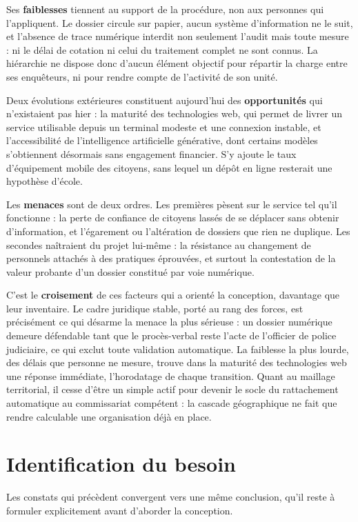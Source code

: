 Ses \textbf{faiblesses} tiennent au support de la procédure, non aux personnes qui l'appliquent. Le dossier circule sur papier, aucun système d'information ne le suit, et l'absence de trace numérique interdit non seulement l'audit mais toute mesure : ni le délai de cotation ni celui du traitement complet ne sont connus. La hiérarchie ne dispose donc d'aucun élément objectif pour répartir la charge entre ses enquêteurs, ni pour rendre compte de l'activité de son unité.

Deux évolutions extérieures constituent aujourd'hui des \textbf{opportunités} qui n'existaient pas hier : la maturité des technologies web, qui permet de livrer un service utilisable depuis un terminal modeste et une connexion instable, et l'accessibilité de l'intelligence artificielle générative, dont certains modèles s'obtiennent désormais sans engagement financier. S'y ajoute le taux d'équipement mobile des citoyens, sans lequel un dépôt en ligne resterait une hypothèse d'école.

Les \textbf{menaces} sont de deux ordres. Les premières pèsent sur le service tel qu'il fonctionne : la perte de confiance de citoyens lassés de se déplacer sans obtenir d'information, et l'égarement ou l'altération de dossiers que rien ne duplique. Les secondes naîtraient du projet lui-même : la résistance au changement de personnels attachés à des pratiques éprouvées, et surtout la contestation de la valeur probante d'un dossier constitué par voie numérique.

C'est le \textbf{croisement} de ces facteurs qui a orienté la conception, davantage que leur inventaire. Le cadre juridique stable, porté au rang des forces, est précisément ce qui désarme la menace la plus sérieuse : un dossier numérique demeure défendable tant que le procès-verbal reste l'acte de l'officier de police judiciaire, ce qui exclut toute validation automatique. La faiblesse la plus lourde, des délais que personne ne mesure, trouve dans la maturité des technologies web une réponse immédiate, l'horodatage de chaque transition. Quant au maillage territorial, il cesse d'être un simple actif pour devenir le socle du rattachement automatique au commissariat compétent : la cascade géographique ne fait que rendre calculable une organisation déjà en place.

\section{Identification du besoin}

Les constats qui précèdent convergent vers une même conclusion, qu'il reste à formuler explicitement avant d'aborder la conception.

